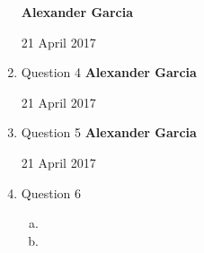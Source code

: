 \documentclass[11pt]{article}
\begin{document}
\begin{enumerate}
\begin{enumerate}[(a)]
			\end{enumerate}
\newpage
\textbf{Alexander Garcia}

21 April 2017 \\

		\item Question 4
\newpage
\textbf{Alexander Garcia}

21 April 2017 \\

		\item Question 5
\newpage
\textbf{Alexander Garcia}

21 April 2017 \\

		\item Question 6

			\begin{enumerate}[(a)]

				\item

				\item

			\end{enumerate}

	\end{enumerate}
\end{document}
